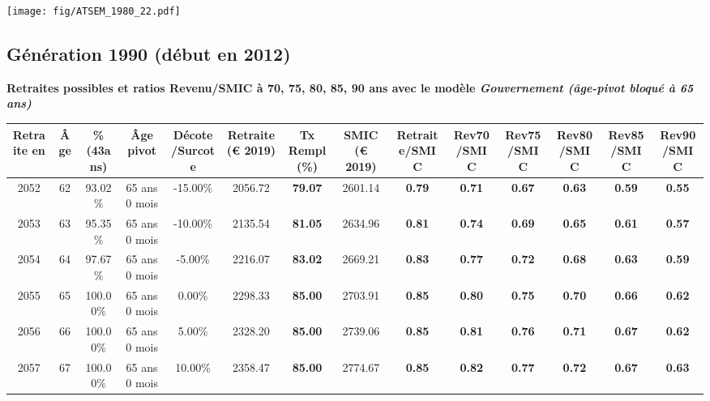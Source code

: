  \vspace{0.1cm} 

 \begin{center}\texttt{[image: fig/ATSEM\_1980\_22.pdf]}\end{center} \label{fig/ATSEM_1980_22.pdf} 

\newpage 
 
\subsection{Génération 1990 (début en 2012)} 

{\bf \noindent Retraites possibles et ratios Revenu/SMIC à 70, 75, 80, 85, 90 ans avec le modèle \emph{Gouvernement (âge-pivot bloqué à 65 ans)}}  
 
\begin{adjustbox}{max width=\textwidth} 
\begin{tabular}[htb]{|c|c||c|c|c||c|c||c||c|c|c|c|c|c|} 
\hline 
 Retraite en &  Âge &  \%(43ans) &  Âge pivot &  Décote/Surcote &  Retraite (\euro{} 2019) &  Tx Rempl(\%) &  SMIC (\euro{} 2019) &  Retraite/SMIC &  Rev70/SMIC &  Rev75/SMIC &  Rev80/SMIC &  Rev85/SMIC &  Rev90/SMIC \\ 
\hline \hline 
 2052 &  62 &  93.02\% &  65 ans 0 mois &  -15.00\% &  2056.72 &  {\bf 79.07} &  2601.14 &  {\bf {\color{red} 0.79}} &  {\bf {\color{red} 0.71}} &  {\bf {\color{red} 0.67}} &  {\bf {\color{red} 0.63}} &  {\bf {\color{red} 0.59}} &  {\bf {\color{red} 0.55}} \\ 
\hline 
 2053 &  63 &  95.35\% &  65 ans 0 mois &  -10.00\% &  2135.54 &  {\bf 81.05} &  2634.96 &  {\bf {\color{red} 0.81}} &  {\bf {\color{red} 0.74}} &  {\bf {\color{red} 0.69}} &  {\bf {\color{red} 0.65}} &  {\bf {\color{red} 0.61}} &  {\bf {\color{red} 0.57}} \\ 
\hline 
 2054 &  64 &  97.67\% &  65 ans 0 mois &  -5.00\% &  2216.07 &  {\bf 83.02} &  2669.21 &  {\bf {\color{red} 0.83}} &  {\bf {\color{red} 0.77}} &  {\bf {\color{red} 0.72}} &  {\bf {\color{red} 0.68}} &  {\bf {\color{red} 0.63}} &  {\bf {\color{red} 0.59}} \\ 
\hline 
 2055 &  65 &  100.00\% &  65 ans 0 mois &  0.00\% &  2298.33 &  {\bf 85.00} &  2703.91 &  {\bf {\color{red} 0.85}} &  {\bf {\color{red} 0.80}} &  {\bf {\color{red} 0.75}} &  {\bf {\color{red} 0.70}} &  {\bf {\color{red} 0.66}} &  {\bf {\color{red} 0.62}} \\ 
\hline 
 2056 &  66 &  100.00\% &  65 ans 0 mois &  5.00\% &  2328.20 &  {\bf 85.00} &  2739.06 &  {\bf {\color{red} 0.85}} &  {\bf {\color{red} 0.81}} &  {\bf {\color{red} 0.76}} &  {\bf {\color{red} 0.71}} &  {\bf {\color{red} 0.67}} &  {\bf {\color{red} 0.62}} \\ 
\hline 
 2057 &  67 &  100.00\% &  65 ans 0 mois &  10.00\% &  2358.47 &  {\bf 85.00} &  2774.67 &  {\bf {\color{red} 0.85}} &  {\bf {\color{red} 0.82}} &  {\bf {\color{red} 0.77}} &  {\bf {\color{red} 0.72}} &  {\bf {\color{red} 0.67}} &  {\bf {\color{red} 0.63}} \\ 
\hline 
\hline 
\end{tabular} 
\end{adjustbox} 
 
